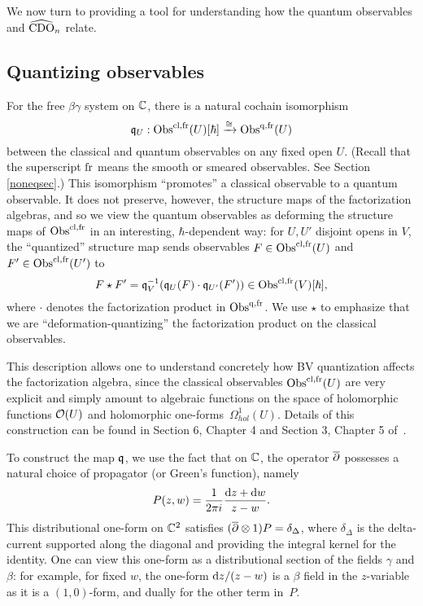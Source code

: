 We now turn to providing a tool for understanding how the quantum observables
and $\widehat{\rm CDO}_n$ relate.

\subsection{Quantizing observables}
\label{sec quant map}

For the free $\beta\gamma$ system on $\mathbb C$, 
there is a natural cochain isomorphism 
\[
\frak{q}_U: {\rm Obs}^{{\rm cl},{\rm fr}}(U)[\hbar] \xrightarrow{\cong} {\rm Obs}^{{\rm q},{\rm fr}}(U)
\]
between the classical and quantum observables on any fixed open $U$.
(Recall that the superscript ${\rm fr}$ means the smooth or smeared observables.
See Section \ref{noneqsec}.)
This isomorphism ``promotes'' a classical observable to a quantum observable.
It does not preserve, however, the structure maps of the factorization algebras,
and so we view the quantum observables as deforming the structure maps of ${\rm Obs}^{{\rm cl},{\rm fr}}$ in an interesting, $\hbar$-dependent way:
for $U, U'$ disjoint opens in $V$, the ``quantized'' structure map sends observables 
$F \in {\rm Obs}^{{\rm cl},{\rm fr}}(U)$ and $F' \in {\rm Obs}^{{\rm cl},{\rm fr}}(U')$ to 
\[
F \star F' = \frak{q}_{V}^{-1}(\frak{q}_U(F) \cdot \frak{q}_{U'}(F')) \in {\rm Obs}^{{\rm cl},{\rm fr}}(V)[\hbar],
\]
where $\cdot$ denotes the factorization product in ${\rm Obs}^{{\rm q},{\rm fr}}$.
We use $\star$ to emphasize that we are ``deformation-quantizing'' the factorization product on the classical observables.

This description allows one to understand concretely how BV quantization affects the factorization algebra,
since the classical observables ${\rm Obs}^{{\rm cl},{\rm fr}}(U)$ are very explicit and simply amount to algebraic functions on the space of holomorphic functions $\mathcal O(U)$ and holomorphic one-forms~$\Omega^1_{hol}(U)$.
Details of this construction can be found in Section 6, Chapter 4 and Section 3, Chapter 5 of~\cite{CG1}.

To construct the map $\frak{q}$, we use the fact that on $\mathbb C$, 
the operator $\overline{\partial}$ possesses a natural choice of propagator (or Green's function),
namely
\[
P(z,w) = \frac{1}{2\pi i}\frac{{\rm d} z + {\rm d} w}{z - w}.
\]
This distributional one-form on $\mathbb C^2$ satisfies $(\overline{\partial} \otimes 1) P = \delta_{\Delta}$, 
where $\delta_{\Delta}$ is the delta-current supported along the diagonal and providing the integral kernel for the identity.
One can view this one-form as a distributional section of the fields $\gamma$ and $\beta$:
for example, for fixed $w$, the one-form ${\rm d} z/(z-w)$ is a $\beta$ field in the $z$-variable as it is a $(1,0)$-form,
and dually for the other term in~$P$.

